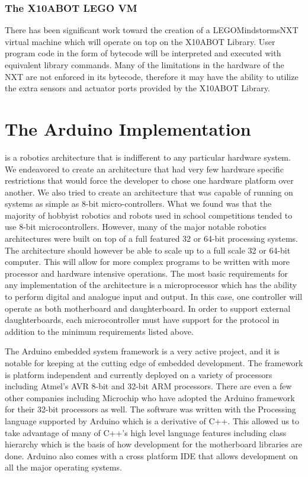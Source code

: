	\subsubsection{The X10ABOT LEGO VM} %
	\label{ssub:the_x10abot_lego_vm}
	There has been significant work toward the creation of a LEGO\textregistered Mindstorms\textregistered NXT virtual machine which will operate on top on the X10ABOT Library. User program code in the form of bytecode will be interpreted and executed with equivalent library commands. Many of the limitations in the hardware of the NXT are not enforced in its bytecode, therefore it may have the ability to utilize the extra sensors and actuator ports provided by the X10ABOT Library.
	


\section{The Arduino Implementation} %
\label{sec:the_arduino_implementation}
\xten is a robotics architecture that is indifferent to any particular hardware system. We endeavored to create an architecture that had very few hardware specific restrictions that would force the developer to chose one hardware platform over another. We also tried to create an architecture that was capable of running on systems as simple as 8-bit micro-controllers. What we found was that the majority of hobbyist robotics and robots used in school competitions tended to use 8-bit microcontrollers. However, many of the major notable robotics architectures were built on top of a full featured 32 or 64-bit processing systems\cite{Elkady2012}. The architecture should however be able to scale up to a full scale 32 or 64-bit computer. This will allow for more complex programs to be written with more processor and hardware intensive operations. The most basic requirements for any implementation of the \xten architecture is a microprocessor which has the ability to perform digital and analogue input and output. In this case, one controller will operate as both motherboard and daughterboard. In order to support external daughterboards, each microcontroller must have support for the \iic protocol in addition to the minimum requirements listed above.

The Arduino embedded system framework is a very active project, and it is notable for keeping at the cutting edge of embedded development. The framework is platform independent and currently deployed on a variety of processors including Atmel's AVR 8-bit and 32-bit ARM processors. There are even a few other companies including Microchip who have adopted the Arduino framework for their 32-bit processors as well\cite{Development2012}. 
The \xten software was written with the Processing language supported by Arduino which is a derivative of C++. This allowed us to take advantage of many of C++'s high level language features including class hierarchy which is the basis of how development for the motherboard libraries are done. Arduino also comes with a cross platform IDE that allows development on all the major operating systems.

